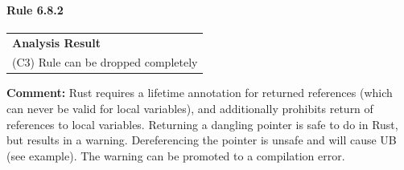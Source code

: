 \paragraph{Rule 6.8.2}
\begin{longtable}{p{13cm}}
\textbf{Analysis Result} \\
(C3) Rule can be dropped completely \\
\end{longtable}
\textbf{Comment:} Rust requires a lifetime annotation for returned references (which can never be valid for local variables), and additionally prohibits return of references to local variables. Returning a dangling pointer is safe to do in Rust, but results in a warning. Dereferencing the pointer is unsafe and will cause UB (see example). The warning can be promoted to a compilation error. \\


